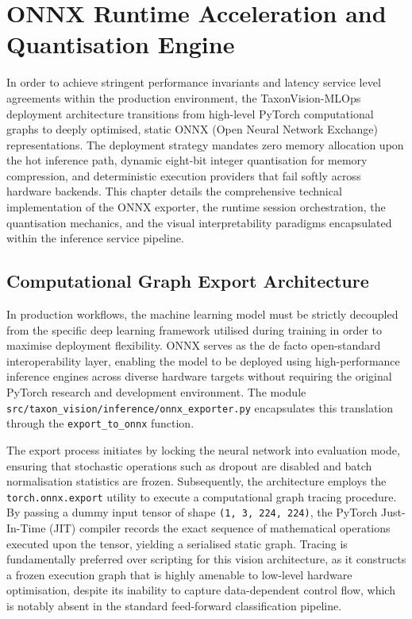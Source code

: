 \chapter{ONNX Runtime Acceleration and Quantisation Engine}
\label{ch:onnx_runtime_optimization}

In order to achieve stringent performance invariants and latency service level agreements within the production environment, the TaxonVision-MLOps deployment architecture transitions from high-level PyTorch computational graphs to deeply optimised, static ONNX (Open Neural Network Exchange) representations. The deployment strategy mandates zero memory allocation upon the hot inference path, dynamic eight-bit integer quantisation for memory compression, and deterministic execution providers that fail softly across hardware backends. This chapter details the comprehensive technical implementation of the ONNX exporter, the runtime session orchestration, the quantisation mechanics, and the visual interpretability paradigms encapsulated within the inference service pipeline.



\section{Computational Graph Export Architecture}
\label{sec:onnx_graph_export}

In production workflows, the machine learning model must be strictly decoupled from the specific deep learning framework utilised during training in order to maximise deployment flexibility. ONNX serves as the de facto open-standard interoperability layer, enabling the model to be deployed using high-performance inference engines across diverse hardware targets without requiring the original PyTorch research and development environment. The module \texttt{src/taxon\_vision/inference/onnx\_exporter.py} encapsulates this translation through the \texttt{export\_to\_onnx} function.

The export process initiates by locking the neural network into evaluation mode, ensuring that stochastic operations such as dropout are disabled and batch normalisation statistics are frozen. Subsequently, the architecture employs the \texttt{torch.onnx.export} utility to execute a computational graph tracing procedure. By passing a dummy input tensor of shape \texttt{(1, 3, 224, 224)}, the PyTorch Just-In-Time (JIT) compiler records the exact sequence of mathematical operations executed upon the tensor, yielding a serialised static graph. Tracing is fundamentally preferred over scripting for this vision architecture, as it constructs a frozen execution graph that is highly amenable to low-level hardware optimisation, despite its inability to capture data-dependent control flow, which is notably absent in the standard feed-forward classification pipeline.


